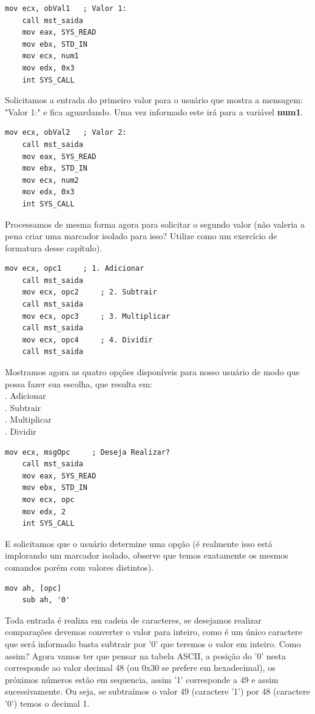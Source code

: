 \begin{lstlisting}[]
	mov ecx, obVal1   ; Valor 1:
	call mst_saida
	mov eax, SYS_READ
	mov ebx, STD_IN
	mov ecx, num1
	mov edx, 0x3
	int SYS_CALL	
\end{lstlisting}

Solicitamos a entrada do primeiro valor para o usuário que mostra a mensagem: "Valor 1:" e fica aguardando. Uma vez informado este irá para a variável \textbf{num1}.

\begin{lstlisting}[]
	mov ecx, obVal2   ; Valor 2:
	call mst_saida
	mov eax, SYS_READ
	mov ebx, STD_IN
	mov ecx, num2
	mov edx, 0x3
	int SYS_CALL
\end{lstlisting}

Processamos de mesma forma agora para solicitar o segundo valor (não valeria a pena criar uma marcador isolado para isso? Utilize como um exercício de formatura desse capítulo).

\begin{lstlisting}[]
	mov ecx, opc1     ; 1. Adicionar
	call mst_saida
	mov ecx, opc2     ; 2. Subtrair
	call mst_saida
	mov ecx, opc3     ; 3. Multiplicar
	call mst_saida
	mov ecx, opc4     ; 4. Dividir
	call mst_saida
\end{lstlisting}

Mostramos agora as quatro opções disponíveis para nosso usuário de modo que possa fazer sua escolha, que resulta em: \\
{. Adicionar} \\
{. Subtrair} \\
{. Multiplicar} \\
{. Dividir}

\begin{lstlisting}[]
	mov ecx, msgOpc     ; Deseja Realizar?
	call mst_saida
	mov eax, SYS_READ
	mov ebx, STD_IN
	mov ecx, opc
	mov edx, 2
	int SYS_CALL
\end{lstlisting}

E solicitamos que o usuário determine uma opção (é realmente isso está implorando um marcador isolado, observe que temos exatamente os mesmos comandos porém com valores distintos).

\begin{lstlisting}[]
	mov ah, [opc]
	sub ah, '0'
\end{lstlisting}

Toda entrada é realiza em cadeia de caracteres, se desejamos realizar comparações devemos converter o valor para inteiro, como é um único caractere que será informado basta subtrair por '0' que teremos o valor em inteiro. Como assim? Agora vamos ter que pensar na tabela ASCII, a posição do '0' nesta corresponde ao valor decimal 48 (ou 0x30 se prefere em hexadecimal), os próximos números estão em sequencia, assim '1' corresponde a 49 e assim sucessivamente. Ou seja, se subtraímos o valor 49 (caractere '1') por 48 (caractere '0') temos o decimal 1.

